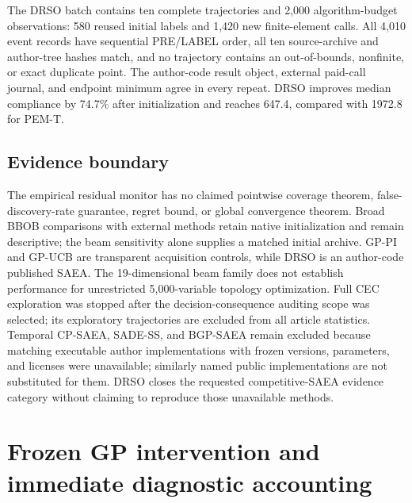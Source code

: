 \documentclass[suppldata]{interact}
\begin{document}
The DRSO batch contains ten complete trajectories and 2,000 algorithm-budget observations: 580 reused initial labels and 1,420 new finite-element calls. All 4,010 event records have sequential PRE/LABEL order, all ten source-archive and author-tree hashes match, and no trajectory contains an out-of-bounds, nonfinite, or exact duplicate point. The author-code result object, external paid-call journal, and endpoint minimum agree in every repeat. DRSO improves median compliance by 74.7\% after initialization and reaches 647.4, compared with 1972.8 for PEM-T.

\hypertarget{evidence-boundary}{%
\subsection{Evidence boundary}\label{evidence-boundary}}

The empirical residual monitor has no claimed pointwise coverage theorem, false-discovery-rate guarantee, regret bound, or global convergence theorem. Broad BBOB comparisons with external methods retain native initialization and remain descriptive; the beam sensitivity alone supplies a matched initial archive. GP-PI and GP-UCB are transparent acquisition controls, while DRSO is an author-code published SAEA. The 19-dimensional beam family does not establish performance for unrestricted 5,000-variable topology optimization. Full CEC exploration was stopped after the decision-consequence auditing scope was selected; its exploratory trajectories are excluded from all article statistics. Temporal CP-SAEA, SADE-SS, and BGP-SAEA remain excluded because matching executable author implementations with frozen versions, parameters, and licenses were unavailable; similarly named public implementations are not substituted for them. DRSO closes the requested competitive-SAEA evidence category without claiming to reproduce those unavailable methods.

\hypertarget{frozen-gp-intervention-and-immediate-diagnostic-accounting}{%
\section{Frozen GP intervention and immediate diagnostic accounting}\label{frozen-gp-intervention-and-immediate-diagnostic-accounting}}
\end{document}
